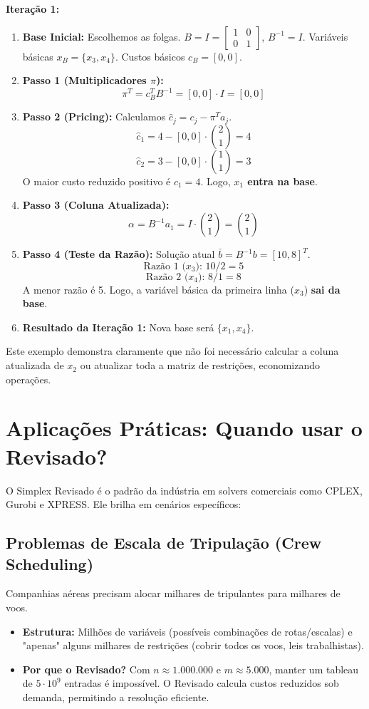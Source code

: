 \documentclass[12pt, a4paper]{article}
\begin{document}
\textbf{Iteração 1:}
\begin{enumerate}
    \item \textbf{Base Inicial:} Escolhemos as folgas. $B = I = \begin{bmatrix} 1 & 0 \\ 0 & 1 \end{bmatrix}$, $B^{-1} = I$. Variáveis básicas $x_B = \{x_3, x_4\}$. Custos básicos $c_B = [0, 0]$.
    
    \item \textbf{Passo 1 (Multiplicadores $\pi$):}
    $$ \pi^T = c_B^T B^{-1} = [0, 0] \cdot I = [0, 0] $$
    
    \item \textbf{Passo 2 (Pricing):} Calculamos $\hat{c}_j = c_j - \pi^T a_j$.
    $$ \hat{c}_1 = 4 - [0,0]\cdot \binom{2}{1} = 4 $$
    $$ \hat{c}_2 = 3 - [0,0]\cdot \binom{1}{1} = 3 $$
    O maior custo reduzido positivo é $\hat{c}_1 = 4$. Logo, \textbf{$x_1$ entra na base}.
    
    \item \textbf{Passo 3 (Coluna Atualizada):}
    $$ \alpha = B^{-1} a_1 = I \cdot \binom{2}{1} = \binom{2}{1} $$
    
    \item \textbf{Passo 4 (Teste da Razão):}
    Solução atual $\bar{b} = B^{-1}b = [10, 8]^T$.
    $$ \text{Razão 1 ($x_3$): } 10 / 2 = 5 $$
    $$ \text{Razão 2 ($x_4$): } 8 / 1 = 8 $$
    A menor razão é 5. Logo, a variável básica da primeira linha ($x_3$) \textbf{sai da base}.
    
    \item \textbf{Resultado da Iteração 1:} Nova base será $\{x_1, x_4\}$.
\end{enumerate}

Este exemplo demonstra claramente que não foi necessário calcular a coluna atualizada de $x_2$ ou atualizar toda a matriz de restrições, economizando operações.

\section{Aplicações Práticas: Quando usar o Revisado?}
O Simplex Revisado é o padrão da indústria em solvers comerciais como CPLEX, Gurobi e XPRESS. Ele brilha em cenários específicos:

\subsection{Problemas de Escala de Tripulação (Crew Scheduling)}
Companhias aéreas precisam alocar milhares de tripulantes para milhares de voos.
\begin{itemize}
    \item \textbf{Estrutura:} Milhões de variáveis (possíveis combinações de rotas/escalas) e "apenas" alguns milhares de restrições (cobrir todos os voos, leis trabalhistas).
    \item \textbf{Por que o Revisado?} Com $n \approx 1.000.000$ e $m \approx 5.000$, manter um tableau de $5 \cdot 10^9$ entradas é impossível. O Revisado calcula custos reduzidos sob demanda, permitindo a resolução eficiente.
\end{itemize}
\end{document}
